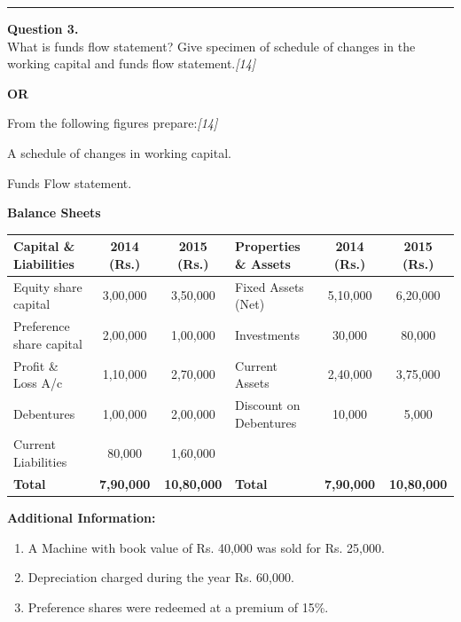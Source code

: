\documentclass[11pt,a4paper]{article}
\newcommand{\pts}[1]{\hfill   \textit{[#1]}}
\begin{document}
\medskip\rule{\linewidth}{0.2pt}

\pagebreak




\noindent   \textbf{Question 3.} \\
What is funds flow statement? Give specimen of schedule of changes in the working capital and funds flow statement.\pts{14}

\centerline{   \textbf{OR}}

From the following figures prepare:\pts{14}

\begin{parts}
  \item A schedule of changes in working capital.
  \item Funds Flow statement.
\end{parts}


\begin{center}
\small
   \textbf{Balance Sheets} \\[4pt]
\renewcommand{\arraystretch}{1.2}

\begin{tabular}{|l|c|c|l|c|c|}
\hline
   \textbf{Capital \& Liabilities} &   \textbf{2014 (Rs.)} &   \textbf{2015 (Rs.)} &   \textbf{Properties \& Assets} &   \textbf{2014 (Rs.)} &   \textbf{2015 (Rs.)} \\ \hline
Equity share capital & 3,00,000 & 3,50,000 & Fixed Assets (Net) & 5,10,000 & 6,20,000 \\
Preference share capital & 2,00,000 & 1,00,000 & Investments & 30,000 & 80,000 \\
Profit \& Loss A/c & 1,10,000 & 2,70,000 & Current Assets & 2,40,000 & 3,75,000 \\
Debentures & 1,00,000 & 2,00,000 & Discount on Debentures & 10,000 & 5,000 \\
Current Liabilities & 80,000 & 1,60,000 & & & \\ \hline
   \textbf{Total} &   \textbf{7,90,000} &   \textbf{10,80,000} &   \textbf{Total} &   \textbf{7,90,000} &   \textbf{10,80,000} \\ \hline
\end{tabular}
\end{center}




\noindent   \textbf{Additional Information:}

\begin{enumerate}[label=(\roman*),itemsep=2pt,topsep=2pt]
  \item A Machine with book value of Rs. 40,000 was sold for Rs. 25,000.
  \item Depreciation charged during the year Rs. 60,000.
  \item Preference shares were redeemed at a premium of 15\%.
\end{enumerate}
\end{document}
